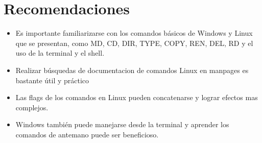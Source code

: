 \documentclass{article}
\begin{document}
\section{Recomendaciones}
\begin{itemize}
    \item Es importante familiarizarse con los comandos básicos de Windows y Linux que se presentan, como MD, CD, DIR, TYPE, COPY, REN, DEL, RD y el uso de la terminal y el shell.
    \item Realizar búsquedas de documentacion de comandos Linux en manpages es bastante útil y práctico
    \item Las flags de los comandos en Linux pueden concatenarse y lograr efectos mas complejos.
    \item Windows también puede manejarse desde la terminal y aprender los comandos de antemano puede ser beneficioso.
\end{itemize}
	
\end{document}
